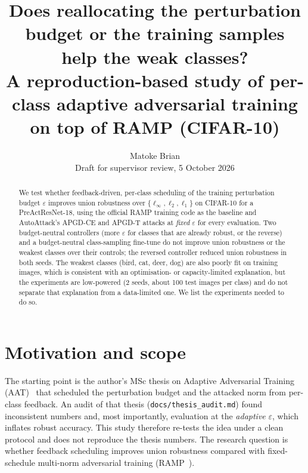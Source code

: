 \documentclass[11pt]{article}
\title{Does reallocating the perturbation budget or the training samples help the weak classes?\\
\large A reproduction-based study of per-class adaptive adversarial training on top of RAMP (CIFAR-10)}
\author{Matoke Brian\\\small Draft for supervisor review, 5 October 2026}
\date{}
\begin{document}
\maketitle
\begin{abstract}
We test whether feedback-driven, per-class scheduling of the training perturbation budget $\varepsilon$ improves
union robustness over $\{\ell_\infty,\ell_2,\ell_1\}$ on CIFAR-10 for a PreActResNet-18, using the official RAMP
training code as the baseline and AutoAttack's APGD-CE and APGD-T attacks at \emph{fixed} $\varepsilon$ for every evaluation. Two budget-neutral
controllers (more $\varepsilon$ for classes that are already robust, or the reverse) and a budget-neutral
class-sampling fine-tune do not improve union robustness or the weakest classes over their controls; the reversed
controller reduced union robustness in both seeds. The weakest classes (bird, cat, deer, dog) are also poorly fit on training images,
which is consistent with an optimisation- or capacity-limited explanation, but the experiments are low-powered
(2 seeds, about 100 test images per class) and do not separate that explanation from a data-limited one.
We list the experiments needed to do so.
\end{abstract}

\section{Motivation and scope}
The starting point is the author's MSc thesis on Adaptive Adversarial Training (AAT)~\cite{thesis} that scheduled the perturbation budget and
the attacked norm from per-class feedback. An audit of that thesis (\texttt{docs/thesis\_audit.md}) found
inconsistent numbers and, most importantly, evaluation at the \emph{adaptive} $\varepsilon$, which inflates robust
accuracy. This study therefore re-tests the idea under a clean protocol and does not reproduce the thesis numbers.
The research question is whether feedback scheduling improves union robustness compared with fixed-schedule
multi-norm adversarial training (RAMP~\cite{ramp}).
\end{document}
